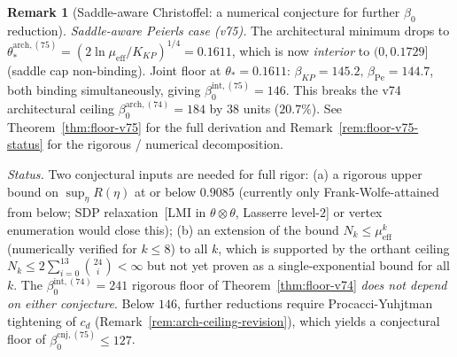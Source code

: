 \documentclass[11pt]{article}
\theoremstyle{definition}
\newtheorem{remark}[theorem]{Remark}
\begin{document}
\begin{remark}[Saddle-aware Christoffel: a numerical conjecture for further $\beta_0$ reduction]
\emph{Saddle-aware Peierls case \textup{(}v75\textup{)}.}  The
architectural minimum drops to
$\theta_*^{\mathrm{arch,(75)}}=(2\ln\mu_{\mathrm{eff}}/K_{KP})^{1/4}=0.1611$,
which is now \emph{interior} to $(0,0.1729]$ \textup{(}saddle cap
non-binding\textup{)}.  Joint floor at $\theta_*=0.1611$:
$\beta_{KP}=145.2,\,\beta_{\mathrm{Pe}}=144.7$, both binding
simultaneously, giving $\boxed{\beta_0^{\mathrm{int,(75)}}=146}$.
This breaks the v74 architectural ceiling $\beta_0^{\mathrm{arch,(74)}}=184$
by $38$ units \textup{(}$20.7\%$\textup{)}.  See Theorem~\ref{thm:floor-v75}
for the full derivation and Remark~\ref{rem:floor-v75-status} for the
rigorous / numerical decomposition.

\emph{Status.}  Two conjectural inputs are needed for full rigor:
\textup{(a)} a rigorous upper bound on $\sup_\eta R(\eta)$ at or below
$0.9085$ \textup{(}currently only Frank-Wolfe-attained from below; SDP
relaxation~\textup{[}LMI in $\theta\otimes\theta$, Lasserre
level-$2$\textup{]} or vertex enumeration would close this\textup{)};
\textup{(b)} an extension of the bound $N_k\le\mu_{\mathrm{eff}}^k$
\textup{(}numerically verified for $k\le 8$\textup{)} to all $k$, which
is supported by the orthant ceiling
$N_k\le 2\sum_{i=0}^{13}\binom{24}{i}<\infty$ but not yet proven as a
single-exponential bound for all $k$.  The
$\beta_0^{\mathrm{int,(74)}}=241$ rigorous floor of
Theorem~\ref{thm:floor-v74} \emph{does not depend on either
conjecture}.  Below $146$, further reductions require Procacci-Yuhjtman
tightening of $c_d$ \textup{(}Remark~\ref{rem:arch-ceiling-revision}\textup{)},
which yields a conjectural floor of $\beta_0^{\mathrm{cnj,(75)}}\le 127$.
\end{remark}
\end{document}
